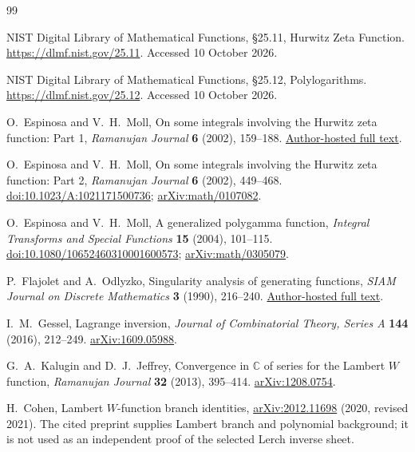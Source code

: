 \begin{thebibliography}{99}
\small\raggedright
\setlength{\itemsep}{1pt}
\setlength{\parskip}{0pt}
\setlength{\parsep}{0pt}
NIST Digital Library of Mathematical Functions, \S25.11,
Hurwitz Zeta Function. \url{https://dlmf.nist.gov/25.11}.
Accessed 10 October 2026.

NIST Digital Library of Mathematical Functions, \S25.12,
Polylogarithms. \url{https://dlmf.nist.gov/25.12}.
Accessed 10 October 2026.

O.~Espinosa and V.~H.~Moll, On some integrals involving the Hurwitz
zeta function: Part 1, \emph{Ramanujan Journal} \textbf{6} (2002),
159--188.
\href{https://www.math.tulane.edu/~vhm/papers_html/hurwitz1.pdf}{Author-hosted full text}.

O.~Espinosa and V.~H.~Moll, On some integrals involving the Hurwitz
zeta function: Part 2, \emph{Ramanujan Journal} \textbf{6} (2002),
449--468.
\href{https://doi.org/10.1023/A:1021171500736}{doi:10.1023/A:1021171500736};
\href{https://arxiv.org/abs/math/0107082}{arXiv:math/0107082}.

O.~Espinosa and V.~H.~Moll, A generalized polygamma function,
\emph{Integral Transforms and Special Functions} \textbf{15} (2004),
101--115.
\href{https://doi.org/10.1080/10652460310001600573}{doi:10.1080/10652460310001600573};
\href{https://arxiv.org/abs/math/0305079}{arXiv:math/0305079}.

P.~Flajolet and A.~Odlyzko, Singularity analysis of generating functions,
\emph{SIAM Journal on Discrete Mathematics} \textbf{3} (1990),
216--240.
\href{https://algo.inria.fr/flajolet/Publications/FlOd90b.pdf}{Author-hosted full text}.

I.~M.~Gessel, Lagrange inversion, \emph{Journal of Combinatorial
Theory, Series A} \textbf{144} (2016), 212--249.
\href{https://arxiv.org/abs/1609.05988}{arXiv:1609.05988}.

G.~A.~Kalugin and D.~J.~Jeffrey, Convergence in $\mathbb C$ of series
for the Lambert $W$ function, \emph{Ramanujan Journal}
\textbf{32} (2013), 395--414.
\href{https://arxiv.org/abs/1208.0754}{arXiv:1208.0754}.

H.~Cohen, Lambert $W$-function branch identities,
\href{https://arxiv.org/abs/2012.11698}{arXiv:2012.11698} (2020,
revised 2021). The cited preprint supplies Lambert branch and polynomial
background; it is not used as an independent proof of the selected
Lerch inverse sheet.


\end{thebibliography}
